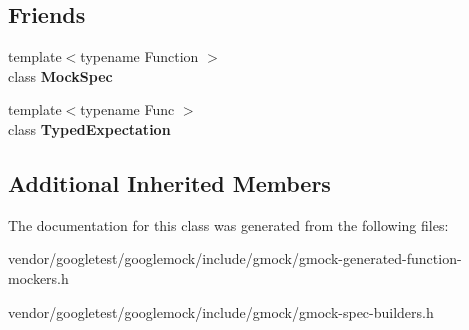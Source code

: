 \subsection*{Friends}
\begin{DoxyCompactItemize}
\item 
{\footnotesize template$<$typename Function $>$ }\\class {\bfseries Mock\+Spec}\hypertarget{classtesting_1_1internal_1_1FunctionMockerBase_ae72aeee91c93e8ae5e1ed7f726a766b2}{}\label{classtesting_1_1internal_1_1FunctionMockerBase_ae72aeee91c93e8ae5e1ed7f726a766b2}

\item 
{\footnotesize template$<$typename Func $>$ }\\class {\bfseries Typed\+Expectation}\hypertarget{classtesting_1_1internal_1_1FunctionMockerBase_a4f17de55396a8ef740d5ad2b1380a851}{}\label{classtesting_1_1internal_1_1FunctionMockerBase_a4f17de55396a8ef740d5ad2b1380a851}

\end{DoxyCompactItemize}
\subsection*{Additional Inherited Members}


The documentation for this class was generated from the following files\+:\begin{DoxyCompactItemize}
\item 
vendor/googletest/googlemock/include/gmock/gmock-\/generated-\/function-\/mockers.\+h\item 
vendor/googletest/googlemock/include/gmock/gmock-\/spec-\/builders.\+h\end{DoxyCompactItemize}
